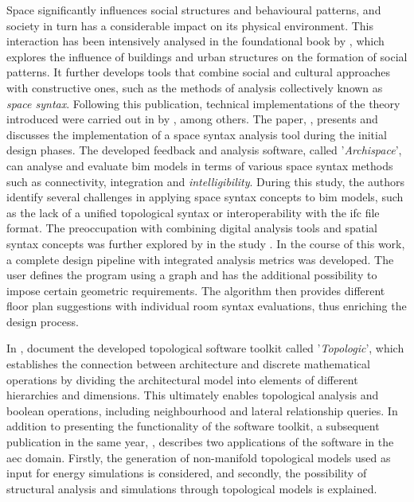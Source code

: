 \documentclass[a4paper, 12pt]{report}
\begin{document}
Space significantly influences social structures and behavioural patterns, and society in turn has a considerable impact on its physical environment. This interaction has been intensively analysed in the foundational book  by \citeauthor{hillier1989social}, which explores the influence of buildings and urban structures on the formation of social patterns. It further develops tools that combine social and cultural approaches with constructive ones, such as the methods of analysis collectively known as \textit{space syntax}. Following this publication, technical implementations of the theory introduced were carried out in \citeyear{li2009design} by \citeauthor{li2009design}, among others. The paper, , presents and discusses the implementation of a space syntax analysis tool during the initial design phases. The developed feedback and analysis software, called '\textit{Archispace}', can analyse and evaluate \acrshort{bim} models in terms of various space syntax methods such as connectivity, integration and \textit{intelligibility}. During this study, the authors identify several challenges in applying space syntax concepts to \acrshort{bim} models, such as the lack of a unified topological syntax or interoperability with the \acrshort{ifc} file format. The preoccupation with combining digital analysis tools and spatial syntax concepts was further explored by \citeauthor{nourian2013designing} in the study . In the course of this work, a complete design pipeline with integrated analysis metrics was developed. The user defines the program using a graph and has the additional possibility to impose certain geometric requirements. The algorithm then provides different floor plan suggestions with individual room syntax evaluations, thus enriching the design process.

In \citeyear{aish2018topologic}, \citeauthor{aish2018topologic} document the developed topological software toolkit called '\textit{Topologic}', which establishes the connection between architecture and discrete mathematical operations by dividing the architectural model into elements of different hierarchies and dimensions. This ultimately enables topological analysis and \Glspl{boolean operation}, including neighbourhood and lateral relationship queries. In addition to presenting the functionality of the software toolkit, a subsequent publication in the same year, , describes two applications of the software in the \acrshort{aec} domain. Firstly, the generation of non-\gls{manifold} topological models used as input for energy simulations is considered, and secondly, the possibility of structural analysis and simulations through topological models is explained.
\end{document}
